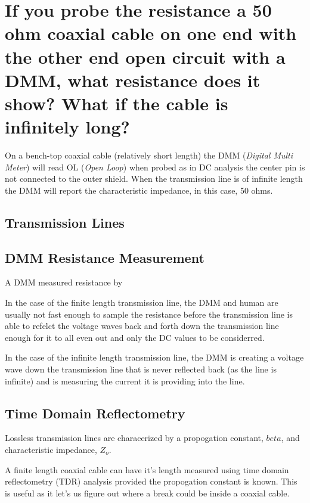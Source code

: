 \documentclass[main.tex]{subfiles}
\begin{document}
\section{If you probe the resistance a 50 ohm coaxial cable on one end with the other end open circuit with a DMM, what resistance does it show? What if the cable is infinitely long?}

\spoilerline


\noindent On a bench-top coaxial cable (relatively short length) the DMM (\textit{Digital Multi Meter}) will read OL (\textit{Open Loop}) when probed as in DC analysis the center pin is not connected to the outer shield. When the transmission line is of infinite length the DMM will report the characteristic impedance, in this case, 50 ohms.

\subsection{Transmission Lines}


\subsection{DMM Resistance Measurement}
A DMM measured resistance by 

In the case of the finite length transmission line, the DMM and human are usually not fast enough to sample the resistance before the transmission line is able to refelct the voltage waves back and forth down the transmission line enough for it to all even out and only the DC values to be considerred.

In the case of the infinite length transmission line, the DMM is creating a voltage wave down the transmission line that is never reflected back (as the line is infinite) and is measuring the current it is providing into the line. 

\subsection{Time Domain Reflectometry}
Lossless transmission lines are characerized by a propogation constant, $beta$, and characteristic impedance, $Z_o$. 

A finite length coaxial cable can have it's length measured using time domain reflectometry (TDR) analysis provided the propogation constant is known. This is useful as it let's us figure out where a break could be inside a coaxial cable. 

\end{document}
